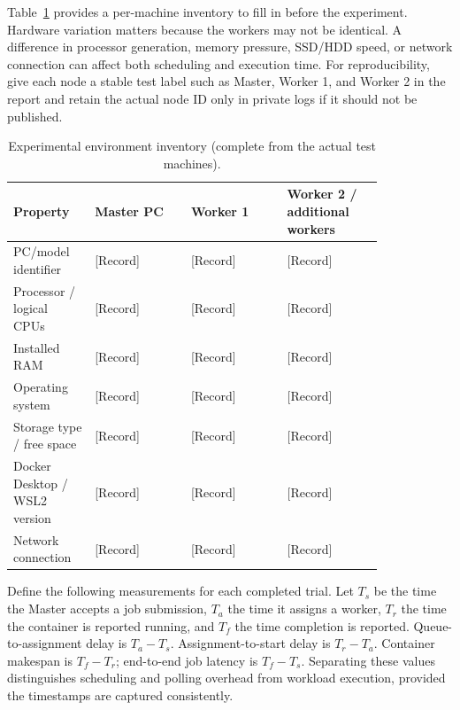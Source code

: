 \documentclass{article}
\begin{document}
Table~\ref{tab:environment} provides a per-machine inventory to fill in before the experiment. Hardware variation matters because the workers may not be identical. A difference in processor generation, memory pressure, SSD/HDD speed, or network connection can affect both scheduling and execution time. For reproducibility, give each node a stable test label such as Master, Worker 1, and Worker 2 in the report and retain the actual node ID only in private logs if it should not be published.
\begin{table}[h!]
\centering
\caption{Experimental environment inventory (complete from the actual test machines).}
\label{tab:environment}
\begin{tabular}{|p{0.17\linewidth}|p{0.22\linewidth}|p{0.22\linewidth}|p{0.22\linewidth}|}
\hline
Property & Master PC & Worker 1 & Worker 2 / additional workers \\
\hline
PC/model identifier & [Record] & [Record] & [Record] \\
\hline
Processor / logical CPUs & [Record] & [Record] & [Record] \\
\hline
Installed RAM & [Record] & [Record] & [Record] \\
\hline
Operating system & [Record] & [Record] & [Record] \\
\hline
Storage type / free space & [Record] & [Record] & [Record] \\
\hline
Docker Desktop / WSL2 version & [Record] & [Record] & [Record] \\
\hline
Network connection & [Record] & [Record] & [Record] \\
\hline
\end{tabular}
\end{table}

Define the following measurements for each completed trial. Let \(T_s\) be the time the Master accepts a job submission, \(T_a\) the time it assigns a worker, \(T_r\) the time the container is reported running, and \(T_f\) the time completion is reported. Queue-to-assignment delay is \(T_a-T_s\). Assignment-to-start delay is \(T_r-T_a\). Container makespan is \(T_f-T_r\); end-to-end job latency is \(T_f-T_s\). Separating these values distinguishes scheduling and polling overhead from workload execution, provided the timestamps are captured consistently.
\end{document}
